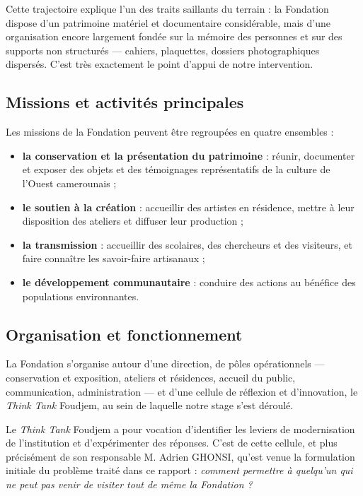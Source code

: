 Cette trajectoire explique l'un des traits saillants du terrain : la Fondation
dispose d'un patrimoine matériel et documentaire considérable, mais d'une
organisation encore largement fondée sur la mémoire des personnes et sur des
supports non structurés — cahiers, plaquettes, dossiers photographiques
dispersés. C'est très exactement le point d'appui de notre intervention.

\subsection{Missions et activités principales}

Les missions de la Fondation peuvent être regroupées en quatre ensembles :

\begin{itemize}
  \item \textbf{la conservation et la présentation du patrimoine} : réunir,
        documenter et exposer des objets et des témoignages représentatifs de la
        culture de l'Ouest camerounais ;
  \item \textbf{le soutien à la création} : accueillir des artistes en
        résidence, mettre à leur disposition des ateliers et diffuser leur
        production ;
  \item \textbf{la transmission} : accueillir des scolaires, des chercheurs et
        des visiteurs, et faire connaître les savoir-faire artisanaux ;
  \item \textbf{le développement communautaire} : conduire des actions au
        bénéfice des populations environnantes.
\end{itemize}

\subsection{Organisation et fonctionnement}

La Fondation s'organise autour d'une direction, de pôles opérationnels
— conservation et exposition, ateliers et résidences, accueil du public,
communication, administration — et d'une cellule de réflexion et d'innovation,
le \emph{Think Tank} Foudjem, au sein de laquelle notre stage s'est déroulé.

Le \emph{Think Tank} Foudjem a pour vocation d'identifier les leviers de
modernisation de l'institution et d'expérimenter des réponses. C'est de cette
cellule, et plus précisément de son responsable M. Adrien GHONSI, qu'est venue
la formulation initiale du problème traité dans ce rapport : \emph{comment
permettre à quelqu'un qui ne peut pas venir de visiter tout de même la
Fondation ?}


